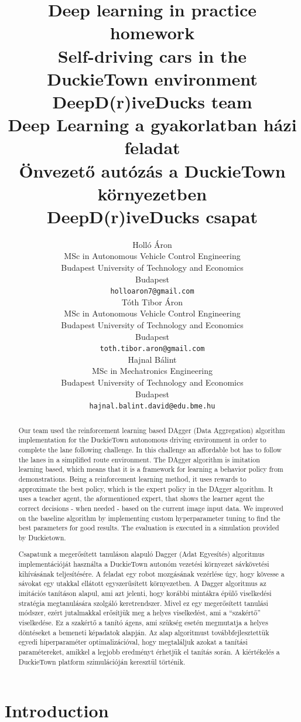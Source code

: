 \documentclass{article}
\title{Deep learning in practice homework \protect\\ Self-driving cars in the DuckieTown environment \protect\\ DeepD(r)iveDucks team  \protect \\ Deep Learning a gyakorlatban házi feladat \protect\\ Önvezető autózás a DuckieTown környezetben \protect\\ DeepD(r)iveDucks csapat}
\author{
  Holló Áron\\
  MSc in Autonomous Vehicle Control Engineering\\
  Budapest University of Technology and Economics\\
  Budapest \\
  \texttt{holloaron7@gmail.com} \\
  \And
  Tóth Tibor Áron\\
  MSc in Autonomous Vehicle Control Engineering\\
  Budapest University of Technology and Economics\\
  Budapest \\
  \texttt{toth.tibor.aron@gmail.com} \\  
  \And
  Hajnal Bálint\\
  MSc in Mechatronics Engineering\\
  Budapest University of Technology and Economics\\
  Budapest \\
  \texttt{hajnal.balint.david@edu.bme.hu} \\  
}
\begin{document}

\maketitle

\begin{abstract}

  Our team used the reinforcement learning based DAgger (Data Aggregation) algorithm implementation for the DuckieTown autonomous driving environment in order to complete the lane following challenge. In this challenge an affordable bot has to follow the lanes in a simplified route environment. The DAgger algorithm is imitation learning based, which means that it is a framework for learning a behavior policy from demonstrations. Being a reinforcement learning method, it uses rewards to approximate the best policy, which is the expert policy in the DAgger algorithm. It uses a teacher agent, the aformentioned expert, that shows the learner agent the correct decisions - when needed - based on the current image input data. We improved on the baseline algorithm by implementing custom hyperparameter tuning to find the best parameters for good results. The evaluation is executed in a simulation provided by Duckietown.
  
  Csapatunk a megerősített tanuláson alapuló Dagger (Adat Egyesítés) algoritmus implementációját használta a DuckieTown autonóm vezetési környezet sávkövetési kihívásának teljesítésére. A feladat egy robot mozgásának vezérlése úgy, hogy kövesse a sávokat egy utakkal ellátott egyszerűsített környezetben. A Dagger algoritmus az imitációs tanításon alapul, ami azt jelenti, hogy korábbi mintákra épülő viselkedési stratégia megtanulására szolgáló keretrendszer. Mivel ez egy megerősített tanulási módszer, ezért jutalmakkal erősítjük meg a helyes viselkedést, ami a “szakértő” viselkedése. Ez a szakértő a tanító ágens, ami szükség esetén megmutatja a helyes döntéseket a bemeneti képadatok alapján. Az alap algoritmust továbbfejlesztettük egyedi hiperparaméter optimalizációval, hogy megtaláljuk azokat a tanítási paramétereket, amikkel a legjobb eredményt érhetjük el tanítás során. A kiértékelés a DuckieTown platform szimulációján keresztül történik. 
  
\end{abstract}

\section{Introduction}
\end{document}
